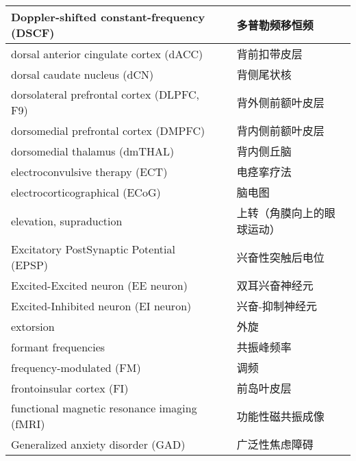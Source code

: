 \begin{longtable}{lll}
	\midrule
	Doppler-shifted constant-frequency (DSCF)     &&  多普勒频移恒频  \\
	
	\midrule
	dorsal anterior cingulate cortex (dACC)     &&  背前扣带皮层  \\
	
	\midrule
	dorsal caudate nucleus (dCN)     &&  背侧尾状核  \\
	
	\midrule
	dorsolateral prefrontal cortex (DLPFC, F9)     &&  背外侧前额叶皮层  \\
	
	\midrule
	dorsomedial prefrontal cortex (DMPFC)     &&  背内侧前额叶皮层  \\
	
	\midrule
	dorsomedial thalamus (dmTHAL)     &&  背内侧丘脑  \\
	
	\midrule
	electroconvulsive therapy (ECT)     &&  电痉挛疗法  \\
	
	\midrule
	electrocorticographical (ECoG)     &&  脑电图  \\
	
	\midrule
	elevation, supraduction     &&  上转（角膜向上的眼球运动）  \\
	
	\midrule
	Excitatory PostSynaptic Potential (EPSP)     &&  兴奋性突触后电位  \\
	
	\midrule
	Excited-Excited neuron (EE neuron)     &&  双耳兴奋神经元  \\
	
	\midrule
	Excited-Inhibited neuron (EI neuron)     && 兴奋-抑制神经元   \\
	
	\midrule
	extorsion     && 外旋   \\
	
	\midrule
	formant frequencies     &&  共振峰频率  \\
	
	\midrule
	frequency-modulated (FM)     &&  调频  \\
	
	\midrule
	frontoinsular cortex (FI)     &&  前岛叶皮层  \\
	
	\midrule
	functional magnetic resonance imaging (fMRI)     &&  功能性磁共振成像  \\
	
	\midrule
	Generalized anxiety disorder (GAD)     &&  广泛性焦虑障碍  \\
	

\end{longtable}
